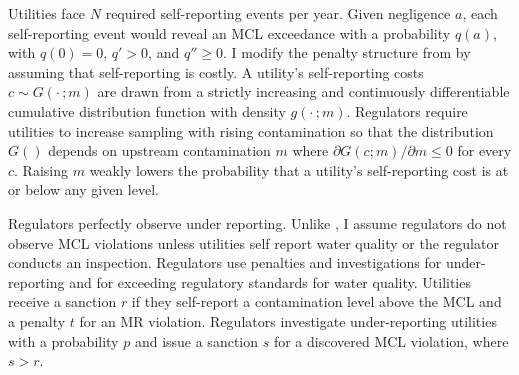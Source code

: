 \documentclass{article}
\begin{document}
	Utilities face $N$ required self-reporting events per year. Given negligence $a$, each self-reporting event would reveal an MCL exceedance with a probability $q(a)$, with $q(0)=0$, $q'>0$, and $q'' \ge 0$. I modify the penalty structure from \textcite{kaplow1994optimal} by assuming that self-reporting is costly. A utility's self-reporting costs $c \sim G(\cdot\,;m)$ are drawn from a strictly increasing and continuously differentiable cumulative distribution function with density $g(\cdot\,;m)$. Regulators require utilities to increase sampling with rising contamination so that the distribution $G()$ depends on upstream contamination $m$ where $\partial G(c;m)/\partial m \le 0$ for every $c$. Raising $m$ weakly lowers the probability that a utility's self-reporting cost is at or below any given level. 
	
	Regulators perfectly observe under reporting. Unlike \textcite{mookherjee1994marginal}, I assume regulators do not observe MCL violations unless utilities self report water quality or the regulator conducts an inspection. Regulators use penalties and investigations for under-reporting and for exceeding regulatory standards for water quality. Utilities receive a sanction $r$ if they self-report a contamination level above the MCL and a penalty $t$ for an MR violation. Regulators investigate under-reporting utilities with a probability $p$ and issue a sanction $s$ for a discovered MCL violation, where $s>r$.
	
	
\end{document}
